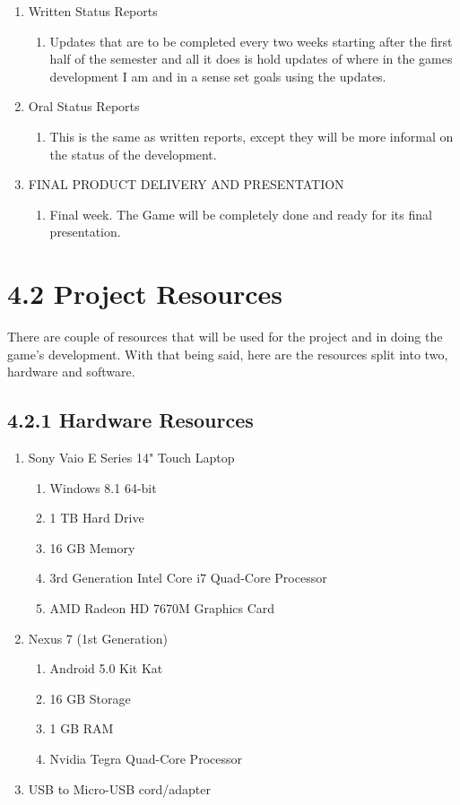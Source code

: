 \documentclass{article}
\begin{document}
\begin{enumerate}
\begin{enumerate}
	\end{enumerate}
\item Written Status Reports
	\begin{enumerate}
	\item Updates that are to be completed every two weeks starting after the first half of the semester and all it does is hold updates of where in the games development I am and in a sense set goals using the updates.
	\end{enumerate}
\item Oral Status Reports
	\begin{enumerate}
	\item This is the same as written reports, except they will be more informal on the status of the development.
	\end{enumerate}
\item FINAL PRODUCT DELIVERY AND PRESENTATION
	\begin{enumerate}
	\item Final week. The Game will be completely done and ready for its final presentation.
	\end{enumerate}
\end{enumerate}

\section{4.2 Project Resources}
There are couple of resources that will be used for the project and in doing the game's development. With that being said, here are the resources split into two, hardware and software.

\subsection{4.2.1 Hardware Resources}
\begin{enumerate}
\item Sony Vaio E Series 14" Touch Laptop
	\begin{enumerate}
	\item Windows 8.1 64-bit
	\item 1 TB Hard Drive
	\item 16 GB Memory
	\item 3rd Generation Intel Core i7 Quad-Core Processor
	\item AMD Radeon HD 7670M Graphics Card
	\end{enumerate}
\item Nexus	7 (1st Generation)
	\begin{enumerate}
	\item Android 5.0 Kit Kat
	\item 16 GB Storage
	\item 1 GB RAM
	\item Nvidia Tegra Quad-Core Processor
	\end{enumerate}
\item  USB to Micro-USB cord/adapter
\end{enumerate} 
\end{document}
